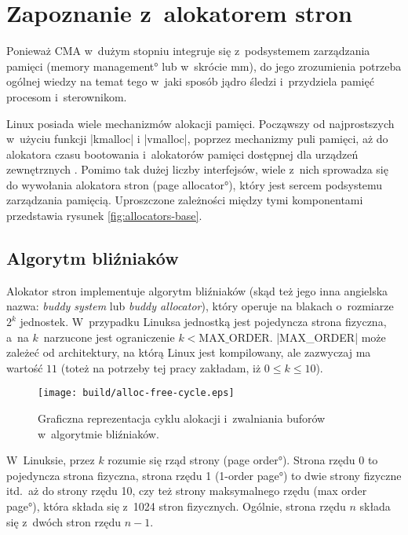\chapter{Zapoznanie z~alokatorem stron}

Ponieważ CMA w~dużym stopniu integruje się z~podsystemem zarządzania
pamięci (\ang{memory management} lub w~skrócie mm), do jego
zrozumienia potrzeba ogólnej wiedzy na temat tego w~jaki sposób jądro
śledzi i~przydziela pamięć procesom i~sterownikom.

Linux posiada wiele mechanizmów alokacji pamięci.  Począwszy od
najprostszych w~użyciu funkcji \code|kmalloc| i \code|vmalloc|,
poprzez mechanizmy puli pamięci, aż do alokatora czasu bootowania
i~alokatorów pamięci dostępnej dla urządzeń zewnętrznych
\cite[rozdział 8]{bib:ldd3}.  Pomimo tak dużej liczby interfejsów,
wiele z~nich sprowadza się do wywołania alokatora stron (\ang{page
  allocator}), który jest sercem podsystemu zarządzania pamięcią.
Uproszczone zależności między tymi komponentami przedstawia rysunek
\ref{fig:allocators-base}.

\section{Algorytm bliźniaków}

Alokator stron implementuje algorytm bliźniaków (skąd też jego inna
angielska nazwa: {\it buddy system} lub {\it buddy allocator}), który
operuje na blakach o~rozmiarze $2^k$ jednostek.  W~przypadku Linuksa
jednostką jest pojedyncza strona fizyczna, a~na $k$~narzucone jest
ograniczenie $k < \mathrm{MAX\_ORDER}$.  \code|MAX_ORDER| może
zależeć od architektury, na którą Linux jest kompilowany, ale
zazwyczaj ma wartość $11$ (toteż na potrzeby tej pracy zakładam, iż $0
\le k \le 10$).

\begin{wrapfigure}{o}[1.5cm]{0.3\textwidth}
\begin{center}
\texttt{[image: build/alloc-free-cycle.eps]}
\end{center}
\caption[Zarządzanie pamięcią w~algorytmie bliźniaków]{Graficzna
  reprezentacja cyklu alokacji i~zwalniania buforów w~algorytmie
  bliźniaków.}
\end{wrapfigure}

W~Linuksie, przez $k$ rozumie się rząd strony (\ang{page order}).
Strona rzędu 0 to pojedyncza strona fizyczna, strona rzędu 1
(\ang{1-order page}) to dwie strony fizyczne itd.\ aż do strony rzędu
10, czy też strony maksymalnego rzędu (\ang{max order page}), która
składa się z~1024 stron fizycznych.  Ogólnie, strona rzędu $n$ składa
się z~dwóch stron rzędu $n-1$.

